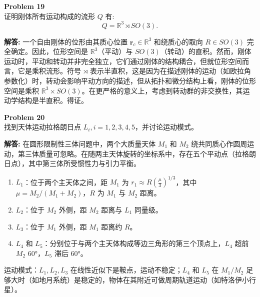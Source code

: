 \documentclass[12pt, a4paper, oneside]{ctexart}
\newenvironment{solution}{\par\noindent\textbf{解答:}\quad}{\par}
\begin{document}
\begin{mdframed}[backgroundcolor=gray!10, linewidth=0pt]
    \textbf{Problem 19} \\
    证明刚体所有运动构成的流形 \(Q\) 有:
    \[
    Q = \mathbb{R}^3 \rtimes SO(3).
    \]
\end{mdframed}
\begin{solution}
    一个自由刚体的位形由其质心位置 \(\mathbf{r}_c \in \mathbb{R}^3\) 和绕质心的取向 \(R \in SO(3)\) 完全确定。因此，位形空间是 \(\mathbb{R}^3\)（平动）与 \(SO(3)\)（转动）的直积。然而，刚体运动时，平动和转动并非完全独立，它们通过刚体的结构耦合，但就位形空间而言，它是乘积流形。符号 \(\rtimes\) 表示半直积，这是因为在描述刚体的运动（如欧拉角参数化）时，转动会影响平动方向的描述，但从拓扑和微分结构上看，刚体的位形空间是乘积 \(\mathbb{R}^3 \times SO(3)\)。在更严格的意义上，考虑到转动群的非交换性，其运动学结构是半直积。得证。
\end{solution}

\begin{mdframed}[backgroundcolor=gray!10, linewidth=0pt]
    \textbf{Problem 20} \\
    找到天体运动拉格朗日点 \(L_i, i=1,2,3,4,5\)，并讨论运动模式。
\end{mdframed}
\begin{solution}
    在圆形限制性三体问题中，两个大质量天体 \(M_1\) 和 \(M_2\) 绕共同质心作圆周运动，第三体质量可忽略。在随两主天体旋转的坐标系中，存在五个平动点（拉格朗日点），其中第三体所受惯性力与引力平衡。
    \begin{enumerate}
        \item \(L_1\)：位于两个主天体之间，距 \(M_1\) 为 \(r_1 \approx R \left( \frac{\mu}{3} \right)^{1/3}\)，其中 \(\mu = M_2/(M_1+M_2)\)，\(R\) 为 \(M_1\) 与 \(M_2\) 距离。
        \item \(L_2\)：位于 \(M_2\) 外侧，距 \(M_2\) 距离与 \(L_1\) 同量级。
        \item \(L_3\)：位于 \(M_1\) 外侧，距 \(M_1\) 距离约 \(R\)。
        \item \(L_4\) 和 \(L_5\)：分别位于与两个主天体构成等边三角形的第三个顶点上，\(L_4\) 超前 \(M_2\) 60°，\(L_5\) 滞后 60°。
    \end{enumerate}
    
    运动模式：\(L_1, L_2, L_3\) 在线性近似下是鞍点，运动不稳定；\(L_4\) 和 \(L_5\) 在 \(M_1/M_2\) 足够大时（如地月系统）是稳定的，物体在其附近可做周期轨道运动（如特洛伊小行星）。
\end{solution}
\end{document}
